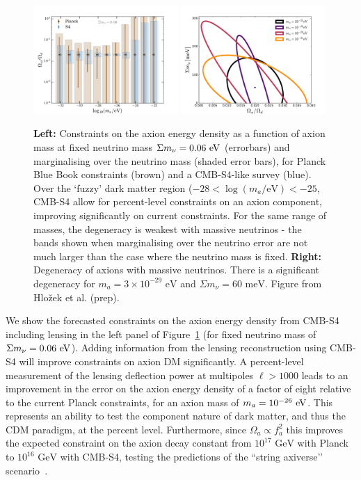 \begin{figure}[t] 
\begin{center} 
\includegraphics[width=0.49\textwidth]{DarkEnergy/Log_constraints_axions_s4.pdf}
\includegraphics[width=0.49\textwidth]{DarkEnergy/s4_frac_omnuh2.pdf}
\caption{\textbf{Left:} Constraints on the axion energy density as a function of axion mass at fixed neutrino mass $\Sigma m_\nu = 0.06~\rm{eV}$ (errorbars) and marginalising over the neutrino mass (shaded error bars), for Planck Blue Book constraints (brown) and a CMB-S4-like survey (blue). Over the `fuzzy' dark matter region ($-28 < \log(m_a/\mathrm{eV}) < -25$, CMB-S4 allow for percent-level constraints on an axion component, improving significantly on current constraints. For the same range of masses, the degeneracy is weakest with massive neutrinos - the bands shown when marginalising over the neutrino error are not much larger than the case where the neutrino mass is fixed. \textbf{Right:} Degeneracy of axions with massive neutrinos. There is a significant degeneracy for $m_a=3\times 10^{-29}\text{ eV}$ and $\Sigma m_\nu=60\text{ meV}$. Figure from Hlo\v{z}ek et al. (prep).
\label{fig:axions}}
\end{center}       
\end{figure}       

We show the forecasted constraints on the axion energy density from CMB-S4 including lensing in the left panel of Figure~\ref{fig:axions} (for fixed neutrino mass of $\Sigma m_\nu = 0.06~\rm{eV}$). Adding information from the lensing reconstruction using CMB-S4 will improve constraints on axion DM significantly. A percent-level measurement of the lensing deflection power at multipoles $\ell > 1000$ leads to an improvement in the error on the axion energy density of a factor of eight relative to the current Planck constraints, for an axion mass of $m_a=10^{-26}~{\rm eV}$.    This represents an ability to test the component nature of dark matter, and thus the CDM paradigm, at the percent level. Furthermore, since $\Omega_a\propto f_a^2$ this improves the expected constraint on the axion decay constant from $10^{17}\text{ GeV}$ with Planck to $10^{16}\text{ GeV}$ with CMB-S4, testing the predictions of the ``string axiverse’’ scenario~\cite{Arvanitaki:2009fg}. 

